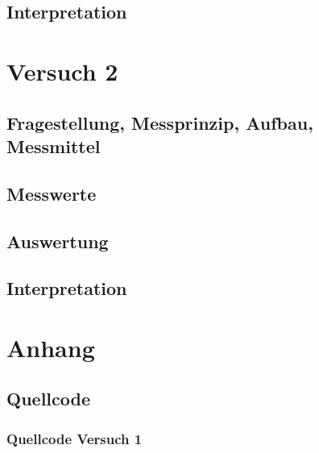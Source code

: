 \documentclass[12pt, oneside, a4paper, \docLanguage]{report}
\begin{document}
\section{Interpretation}
\label{chap:VERSUCH_1_INTERPRETATION}

%
%
\chapter{Versuch 2}
\label{chap:VERSUCH_2}

\section{Fragestellung, Messprinzip, Aufbau, Messmittel}
\label{chap:VERSUCH_2_FRAGESTELLUNG}

\section{Messwerte}
\label{chap:VERSUCH_2_MESSWERTE}

\section{Auswertung}
\label{chap:VERSUCH_2_AUSWERTUNG}

\section{Interpretation}
\label{chap:VERSUCH_2_INTERPRETATION}

%
%
\renewcommand\thesection{A.\arabic{section}}
\renewcommand\thesubsection{\thesection.\arabic{subsection}}

\chapter*{Anhang}
\label{chap:APPENDIX}
\addtocounter{chapter}{1}
\setcounter{section}{0}

\section{Quellcode}
\label{chap:APPENDIX_SOURCECODE}

\subsection{Quellcode Versuch 1}
\label{chap:APPENDIX_SOURCECODE_V1}

\newpage

\newpage

\newpage

\newpage
\end{document}
